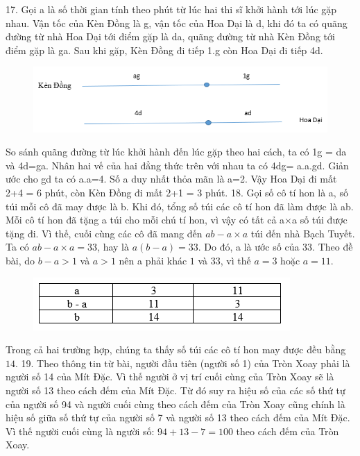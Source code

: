 17. Gọi a là số thời gian tính theo phút từ lúc hai thi sĩ khởi hành tới lúc gặp nhau. Vận tốc của Kèn Đồng là g, vận tốc của Hoa Dại là d, khi đó ta có quãng đường từ nhà Hoa Dại tới điểm gặp là da, quãng đường từ nhà Kèn Đồng tới điểm gặp là ga. Sau khi gặp, Kèn Đồng đi tiếp 1.g còn Hoa Dại đi tiếp 4d.
\begin{figure}[H]
	\centering
	\vspace*{-5pt}
	\captionsetup{labelformat= empty, justification=centering}
	\includegraphics[width=1\linewidth]{13}
	\vspace*{-15pt}
\end{figure}
So sánh quãng đường từ lúc khởi hành đến lúc gặp theo hai cách, ta có 1g = da và 4d=ga.
\vskip 0.1cm
Nhân hai vế của hai đẳng thức trên với nhau ta có 4dg= a.a.gd. Giản ước cho gd ta có  a.a=4. Số a duy nhất thỏa mãn là a=2. Vậy Hoa Dại đi mất 2+4 = 6 phút, còn Kèn Đồng đi mất 2+1 = 3 phút.
\vskip 0.1cm
18. Gọi số cô tí hon là a, số túi mỗi cô đã may được là b. Khi đó, tổng số túi các cô tí hon đã làm được là ab. Mỗi cô tí hon đã tặng a túi cho mỗi chú tí hon, vì vậy có tất cả a×a số túi được tặng đi. Vì thế, cuối cùng các cô đã mang đến $ab - a\times a$ túi đến nhà Bạch Tuyết.
\vskip 0.1cm
Ta có $ab - a\times a =33$, hay là $a(b-a) = 33$. Do đó, a là ước số của 33. Theo đề bài, do $b - a > 1$ và $a>1$ nên a phải khác $1$ và $33$, vì thế $a=3$ hoặc $a= 11$.
\begin{figure}[H]
	\centering
	\vspace*{-5pt}
	\captionsetup{labelformat= empty, justification=centering}
	\includegraphics[width=1\linewidth]{14}
	\vspace*{-15pt}
\end{figure}
Trong cả hai trường hợp, chúng ta thấy số túi các cô tí hon may được đều bằng $14$.
\vskip 0.1cm
19.
Theo thông tin từ bài, người đầu tiên (người số 1) của Tròn Xoay phải là người số 14 của Mít Đặc. Vì thế người ở vị trí cuối cùng của Tròn Xoay sẽ là người số 13 theo cách đếm của Mít Đặc. Từ đó suy ra hiệu số của các số thứ tự của người số 94 và người cuối cùng theo cách đếm của Tròn Xoay cũng chính là hiệu số giữa số thứ tự của người số 7 và người số 13  theo cách đếm của Mít Đặc. Vì thế người cuối cùng là người số: $94+ 13-7=100$ theo cách đếm của Tròn Xoay.
